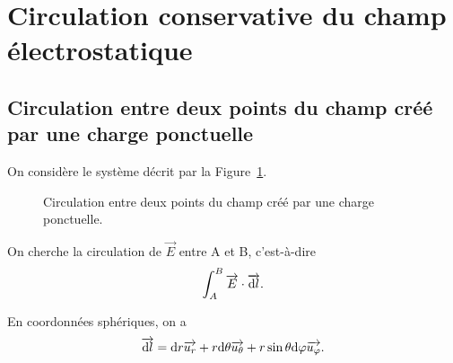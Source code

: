 \section[Circulation du champ électrostatique]{Circulation conservative du champ électrostatique}

    \subsection{Circulation entre deux points du champ créé par une charge ponctuelle}

        On considère le système décrit par la Figure~\ref{fig:circulation_deux_points_champ_cree_charge_ponctuelle}.

        \begin{figure}
            \centering
            \caption{Circulation entre deux points du champ créé par une charge ponctuelle.}    
            \label{fig:circulation_deux_points_champ_cree_charge_ponctuelle}
        \end{figure}
        
        On cherche la circulation de $\vec{E}$ entre A et B, c'est-à-dire 
        \begin{equation*}
            \int_{A}^{B}\protect\overrightarrow{{E}}\cdot\protect\overrightarrow{{\mathrm{d} l}}.
        \end{equation*}

        En coordonnées sphériques, on a
        \begin{equation*}
            \protect\overrightarrow{{\mathrm{d} l}}=\mathrm{d} r\protect\overrightarrow{{u_r}}+r\mathrm{d}\theta\protect\overrightarrow{{u_{\theta}}}+r\sin\theta\mathrm{d}\varphi\protect\overrightarrow{{u_{\varphi}}}.
        \end{equation*}

